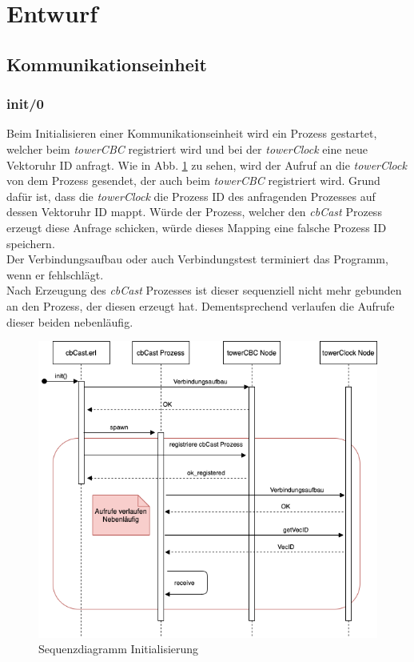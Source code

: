 \section{Entwurf}

\subsection{Kommunikationseinheit} \label{commModule}

\subsubsection{init/0}

Beim Initialisieren einer Kommunikationseinheit wird ein Prozess gestartet, welcher beim \textit{towerCBC} registriert wird und bei der \textit{towerClock} eine neue Vektoruhr ID anfragt. Wie in Abb. \ref{fig:sequence_cbCast_init} zu sehen, wird der Aufruf an die \textit{towerClock} von dem Prozess gesendet, der auch beim \textit{towerCBC} registriert wird. Grund dafür ist, dass die \textit{towerClock} die Prozess ID des anfragenden Prozesses auf dessen Vektoruhr ID mappt. Würde der Prozess, welcher den \textit{cbCast} Prozess erzeugt diese Anfrage schicken, würde dieses Mapping eine falsche Prozess ID speichern.
\\Der Verbindungsaufbau oder auch Verbindungstest terminiert das Programm, wenn er fehlschlägt.
\\Nach Erzeugung des \textit{cbCast} Prozesses ist dieser sequenziell nicht mehr gebunden an den Prozess, der diesen erzeugt hat. Dementsprechend verlaufen die Aufrufe dieser beiden nebenläufig.

\begin{figure}[htbp]
\begin{center}
\includegraphics[scale=0.55]{Latex/Bilder/Sequenzdiagramm_cbCast.png}
\caption{\label{fig:sequence_cbCast_init} Sequenzdiagramm Initialisierung}
\end{center}
\end{figure}

